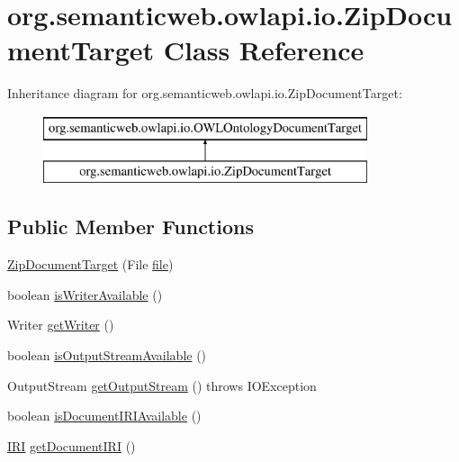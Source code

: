 \hypertarget{classorg_1_1semanticweb_1_1owlapi_1_1io_1_1_zip_document_target}{\section{org.\-semanticweb.\-owlapi.\-io.\-Zip\-Document\-Target Class Reference}
\label{classorg_1_1semanticweb_1_1owlapi_1_1io_1_1_zip_document_target}
}
Inheritance diagram for org.\-semanticweb.\-owlapi.\-io.\-Zip\-Document\-Target\-:\begin{figure}[H]
\begin{center}
\leavevmode
\includegraphics[height=2.000000cm]{classorg_1_1semanticweb_1_1owlapi_1_1io_1_1_zip_document_target}
\end{center}
\end{figure}
\subsection*{Public Member Functions}
\begin{DoxyCompactItemize}
\item 
\hyperlink{classorg_1_1semanticweb_1_1owlapi_1_1io_1_1_zip_document_target_ab3eb302711ee97953ac59fd139392949}{Zip\-Document\-Target} (File \hyperlink{classorg_1_1semanticweb_1_1owlapi_1_1io_1_1_zip_document_target_aba9bfd9b90de1065a627f598e9f151f3}{file})
\item 
boolean \hyperlink{classorg_1_1semanticweb_1_1owlapi_1_1io_1_1_zip_document_target_af82f7e1d86dd29cd6ef360113f883218}{is\-Writer\-Available} ()
\item 
Writer \hyperlink{classorg_1_1semanticweb_1_1owlapi_1_1io_1_1_zip_document_target_a3bee073451c79ceee04e81e4f75f1f58}{get\-Writer} ()
\item 
boolean \hyperlink{classorg_1_1semanticweb_1_1owlapi_1_1io_1_1_zip_document_target_a6154b5937a4a1160d16cd65969b41ed8}{is\-Output\-Stream\-Available} ()
\item 
Output\-Stream \hyperlink{classorg_1_1semanticweb_1_1owlapi_1_1io_1_1_zip_document_target_ab86411abfbf58cefc71817dffe96f952}{get\-Output\-Stream} ()  throws I\-O\-Exception 
\item 
boolean \hyperlink{classorg_1_1semanticweb_1_1owlapi_1_1io_1_1_zip_document_target_adb160afd110c9a9c3052f2836ecd1bbd}{is\-Document\-I\-R\-I\-Available} ()
\item 
\hyperlink{classorg_1_1semanticweb_1_1owlapi_1_1model_1_1_i_r_i}{I\-R\-I} \hyperlink{classorg_1_1semanticweb_1_1owlapi_1_1io_1_1_zip_document_target_a39697e66411f76f0a863946fe1c1936f}{get\-Document\-I\-R\-I} ()
\end{DoxyCompactItemize}
